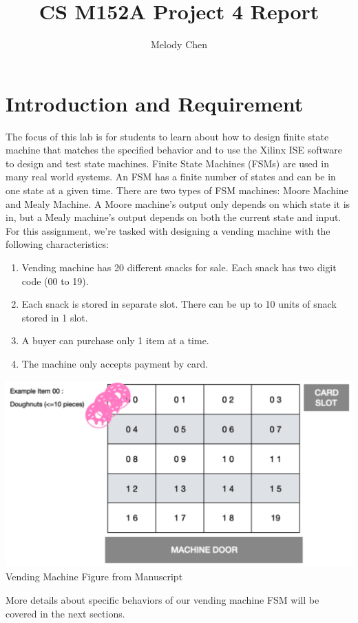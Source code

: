 \documentclass{article}
\title{\vspace{-2.0cm}CS M152A Project 4 Report}
\author{Melody Chen}
\begin{document}
\maketitle
\section{Introduction and Requirement} 
The focus of this lab is for students to learn about how to design finite state machine that matches the specified behavior and to use the Xilinx ISE software to design and test state machines. Finite State Machines (FSMs) are used in many real world systems. An FSM has a finite number of states and can be in one state at a given time. There are two types of FSM machines: Moore Machine and Mealy Machine. A Moore machine's output only depends on which state it is in, but a Mealy machine's output depends on both the current state and input. For this assignment, we're tasked with designing a vending machine with the following characteristics:
\begin{enumerate}
    \item Vending machine has 20 different snacks for sale. Each snack has two digit code (00 to 19).
    \item Each snack is stored in separate slot. There can be up to 10 units of snack stored in 1 slot.
    \item A buyer can purchase only 1 item at a time. 
    \item The machine only accepts payment by card. 
\end{enumerate}
\begin{center}
    \includegraphics[scale=0.5]{intro.png} \\
    \caption{Vending Machine Figure from Manuscript}
\end{center} 
More details about specific behaviors of our vending machine FSM will be covered in the next sections.
\end{document}
